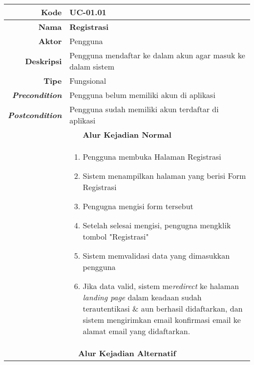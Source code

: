\begin{table}[H]
	\centering
\begin{tabular}{|r|p{8cm}|}
		\hline
		\textbf{Kode}                                                    & UC-01.01                                                     \\ \hline
		\textbf{Nama}                                                    & \textbf{Registrasi}                                         \\ \hline
		\textbf{Aktor}                                                   & Pengguna                                                    \\ \hline
		\textbf{Deskripsi}                                               & Pengguna mendaftar ke dalam akun agar masuk ke dalam sistem \\ \hline
		\textbf{Tipe}                                                    & Fungsional                                                  \\ \hline
		\textbf{\textit{Precondition}}
			& Pengguna belum memiliki akun di aplikasi                    \\ \hline
		\textbf{\textit{Postcondition}} 
			& Pengguna sudah memiliki akun terdaftar di aplikasi          \\ \hline
		\multicolumn{2}{|c|}{\textbf{Alur Kejadian Normal}}                                                                            \\ \hline
		\multicolumn{1}{|l|}{}                                           & 
			\begin{enumerate}
				\item Pengguna membuka Halaman Registrasi
				\item \label{uc0101-show1page}Sistem menampilkan halaman yang berisi Form Registrasi
				\item Pengugna mengisi form tersebut
				\item Setelah selesai mengisi, pengugna mengklik tombol "Registrasi"
				\item \label{al-0101-a} Sistem memvalidasi data yang dimasukkan pengguna
				\item Jika data valid, sistem me\textit{redirect} ke halaman \textit{landing page} dalam keadaan sudah terautentikasi \& aun berhasil didaftarkan, dan sistem mengirimkan email konfirmasi email ke alamat email yang didaftarkan.
			\end{enumerate}
		\\ \hline
		\multicolumn{2}{|c|}{\textbf{Alur Kejadian Alternatif}}                                                         \\ \hline

\end{tabular}
\end{table}
